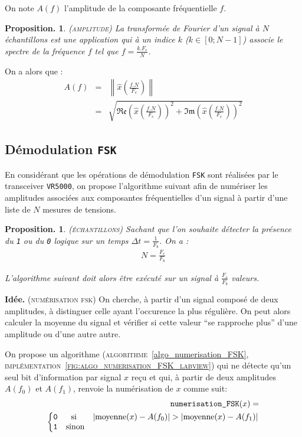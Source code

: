 \documentclass[twocolumn,pre,floats,aps,amsmath,amssymb]{revtex4}
\newtheorem{proposition}[theorem]{Proposition.}
\begin{document}
On note $A (f)$ l'amplitude de la composante fr\'equentielle $f$.

\begin{proposition}
\textsc{(amplitude)}
La transform\'ee de Fourier d'un signal \`a $N$ \'echantillons est une application qui \`a un indice $k$ ($k \in [0 ; N - 1]$) associe le spectre de la fr\'equence $f$ tel que $f = \frac{k.F_e}{N}$.
\end{proposition}

On a alors que\cite{Senlis} :
\begin{eqnarray*}
  A (f) &=& \left \| \hat{x} \left (\frac{f.N}{F_e} \right ) \right \|\\
           &=& \sqrt{\mathfrak{Re} \left ( \hat{x} \left (\frac{f.N}{F_e} \right ) \right )^2 + \mathfrak{Im} \left ( \hat{x} \left (\frac{f.N}{F_e} \right ) \right )^2}
\end{eqnarray*}

\subsection{D\'emodulation \texttt{FSK}}

En consid\'erant que les op\'erations de d\'emodulation \texttt{FSK} sont r\'ealis\'ees par le transceiver \texttt{VR5000}, on propose l'algorithme suivant afin de num\'eriser les amplitudes associ\'ees aux composantes fr\'equentielles d'un signal \`a partir d'une liste de $N$ mesures de tensions.

\begin{proposition}
  \textsc{(\'echantillons)}
  Sachant que l'on souhaite d\'etecter la pr\'esence du \texttt{1} ou du \texttt{0} logique sur un temps $\Delta t = \frac{1}{F_b}$. On a :
  \begin{eqnarray}
    N = \frac{F_e}{F_b}
  \end{eqnarray}

L'algorithme suivant doit alors \^etre ex\'ecut\'e sur un signal \`a $\frac{F_e}{F_b}$ valeurs.
\end{proposition}

\noindent
\textbf{Id\'ee.}
\textsc{(num\'erisation fsk)}
  On cherche, \`a partir d'un signal compos\'e de deux amplitudes, \`a distinguer celle ayant l'occurence la plus r\'eguli\`ere. On peut alors calculer la moyenne du signal et v\'erifier si cette valeur ``se rapproche plus'' d'une amplitude ou d'une autre autre.

On propose un algorithme (\textsc{algorithme}~\ref{algo_numerisation_FSK}, \textsc{impl\'ementation~\ref{fig:algo_numerisation_FSK_labview}}) qui ne d\'etecte qu'un seul bit d'information par signal $x$ re\c{c}u et qui, \`a partir de deux amplitudes $A(f_0)$ et $A(f_1)$, renvoie la num\'erisation de $x$ comme suit:
  \begin{eqnarray*}
    \texttt{numerisation\_FSK} (x) =\\
    \left\{\begin{matrix}
    \texttt{0} &\textup{si }& \left | \operatorname{moyenne}(x) - A(f_0) \right | > \left | \operatorname{moyenne}(x) - A(f_1) \right |\\ 
    \texttt{1} &\textup{sinon}&
    \end{matrix}\right.
  \end{eqnarray*}
\end{document}
